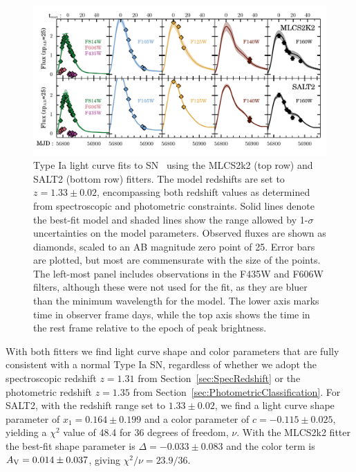 \begin{figure}
\begin{center}
\includegraphics[width=\textwidth]{FIG/snTomas_lightcurve_fit_fluxAB25}
\caption{ Type Ia light curve fits to SN \tomas\ using the MLCS2k2
(top row) and SALT2 (bottom row) fitters. The model redshifts are set to
$z=1.33\pm0.02$, encompassing both redshift values as determined from
spectroscopic and photometric constraints.  Solid lines denote the
best-fit model and shaded lines show the range allowed by 1-$\sigma$
uncertainties on the model parameters. 
Observed fluxes are shown as diamonds, scaled to an AB magnitude
zero point of 25. Error bars are plotted, but most are commensurate
with the size of the points. The left-most panel includes observations
in the F435W and F606W filters, although these were not used for the
fit, as they are bluer than the minimum wavelength for the model. The
lower axis marks time in observer frame days, while the top axis shows
the time in the rest frame relative to the epoch of peak brightness.
\label{fig:LightCurveFits} }
\end{center}
\end{figure}

With both fitters we find light curve shape and color parameters that
are fully consistent with a normal Type Ia SN, regardless of whether
we adopt the spectroscopic redshift $z=1.31$ from
Section~\ref{sec:SpecRedshift} or the photometric redshift $z=1.35$
from Section~\ref{sec:PhotometricClassification}.  For SALT2, with the
redshift range set to $1.33\pm0.02$, we find a light curve shape
parameter of $x_1=0.164\pm0.199$ and a color parameter of
$c=-0.115\pm0.025$, yielding a $\chi^2$ value of 48.4 for 36 degrees
of freedom, $\nu$.  With the MLCS2k2 fitter the best-fit shape
parameter is $\Delta=-0.033\pm0.083$ and the color term is
$A_{\rm V}=0.014\pm0.037$, giving $\chi^2/\nu=23.9/36$.

